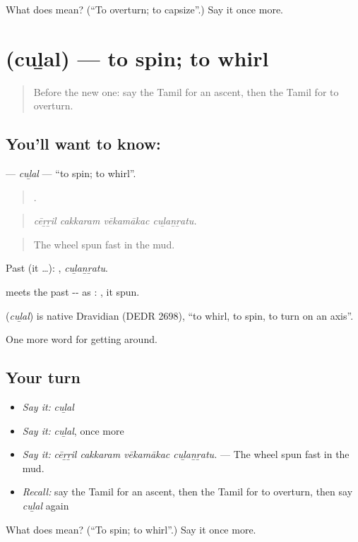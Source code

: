 \begin{tcolorbox}[breakable,colback=teal!4,colframe=teal!35!black,title={Before you move on}]
What does  mean? (\textquotedblleft{}To overturn; to capsize\textquotedblright{}.) Say it once more.
\end{tcolorbox}
\section[\texorpdfstring{\ta{சுழல்} (cuḻal)}{சுழல் (cuḻal)}]{ (cuḻal) — to spin; to whirl}

\label{lesson:TA-C408-culal}



\begin{quote}
Before the new one: say the Tamil for an ascent, then the Tamil for to overturn.
\end{quote}

\subsection*{You'll want to know: }
\textbf{} — \emph{cuḻal} — \textquotedblleft{}to spin; to whirl\textquotedblright{}.

\begin{quote}
   .
\end{quote}

\begin{quote}
\emph{cēṟṟil cakkaram vēkamākac cuḻaṉṟatu.}
\end{quote}

\begin{quote}
The wheel spun fast in the mud.
\end{quote}

Past (it …): , \emph{cuḻaṉṟatu}.

 meets the past -- as : , it spun.

\begin{cousinweb}
\textbf{} (\emph{cuḻal}) is native Dravidian (DEDR 2698), \textquotedblleft{}to whirl, to spin, to turn on an axis\textquotedblright{}.
\end{cousinweb}

\begin{grammarlens}[title={What you've built}]
One more word for getting around.
\end{grammarlens}

\subsection*{Your turn}
\begin{itemize}
\raggedright
  \item \emph{Say it:} \emph{cuḻal}
  \item \emph{Say it:} \emph{cuḻal}, once more
  \item \emph{Say it:} \emph{cēṟṟil cakkaram vēkamākac cuḻaṉṟatu.} — The wheel spun fast in the mud.
  \item \emph{Recall:} say the Tamil for an ascent, then the Tamil for to overturn, then say \emph{cuḻal} again
\end{itemize}

\begin{tcolorbox}[breakable,colback=teal!4,colframe=teal!35!black,title={Before you move on}]
What does  mean? (\textquotedblleft{}To spin; to whirl\textquotedblright{}.) Say it once more.
\end{tcolorbox}
